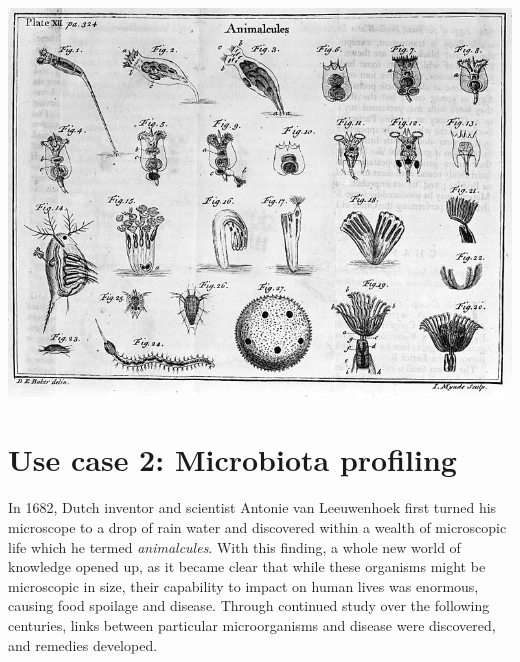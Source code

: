 \begin{justify}
\begin{center}
\begin{minipage}{5in}
\begin{center}
{\vspace*{1cm}
\includegraphics[scale=2]{chapters/images/mycrobiota/animalcules2.png}

}

\end{center}
\end{minipage}
\end{center}

\newpage


\section{Use case 2: Microbiota profiling}

In 1682, Dutch inventor and scientist Antonie van Leeuwenhoek first turned his microscope to a drop of rain water and discovered within a wealth of microscopic life which he termed \textit{animalcules}. With this finding, a whole new world of knowledge opened up, as it became clear that while these organisms might be microscopic in size, their capability to impact on human lives was enormous, causing food spoilage and disease. Through continued study over the following centuries, links between particular microorganisms and disease were discovered, and remedies developed.


\end{justify}
